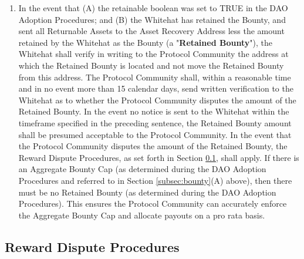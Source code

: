 \documentclass{article}
\begin{document}
\begin{enumerate}[label=\Alph*.]
\begin{enumerate}
              \item In the event that (A) the retainable boolean was set to TRUE in the DAO Adoption Procedures; and (B) the Whitehat has retained the Bounty, and sent all Returnable Assets to the Asset Recovery Address less the amount retained by the Whitehat as the Bounty (a "\textbf{Retained Bounty}"), the Whitehat shall verify in writing to the Protocol Community the address at which the Retained Bounty is located and not move the Retained Bounty from this address. The Protocol Community shall, within a reasonable time and in no event more than 15 calendar days, send written verification to the Whitehat as to whether the Protocol Community disputes the amount of the Retained Bounty. In the event no notice is sent to the Whitehat within the timeframe specified in the preceding sentence, the Retained Bounty amount shall be presumed acceptable to the Protocol Community. In the event that the Protocol Community disputes the amount of the Retained Bounty, the Reward Dispute Procedures, as set forth in Section \ref{subsec:reward_dispute}, shall apply. If there is an Aggregate Bounty Cap (as determined during the DAO Adoption Procedures and referred to in Section \ref{subsec:bounty}(A) above), then there must be no Retained Bounty (as determined during the DAO Adoption Procedures). This ensures the Protocol Community can accurately enforce the Aggregate Bounty Cap and allocate payouts on a pro rata basis.

          \end{enumerate}
\end{enumerate}

\subsection{Reward Dispute Procedures}\label{subsec:reward_dispute}
\end{document}
